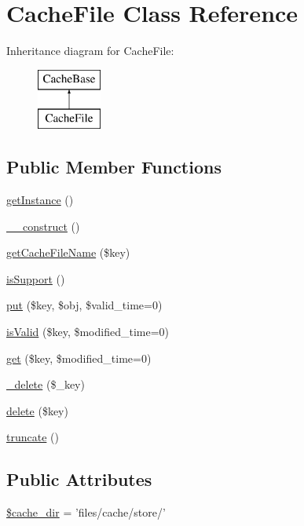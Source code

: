 \hypertarget{classCacheFile}{\section{Cache\-File Class Reference}
\label{classCacheFile}
}
Inheritance diagram for Cache\-File\-:\begin{figure}[H]
\begin{center}
\leavevmode
\includegraphics[height=2.000000cm]{classCacheFile}
\end{center}
\end{figure}
\subsection*{Public Member Functions}
\begin{DoxyCompactItemize}
\item 
\hyperlink{classCacheFile_a5389ea809c31aed387c12eb37b2677b8}{get\-Instance} ()
\item 
\hyperlink{classCacheFile_ac907fef293d1d4a31163651440167bff}{\-\_\-\-\_\-construct} ()
\item 
\hyperlink{classCacheFile_a15ca23dea98604dc2e6d067f9ce48242}{get\-Cache\-File\-Name} (\$key)
\item 
\hyperlink{classCacheFile_ab3982221be8af4a74302b648831d1376}{is\-Support} ()
\item 
\hyperlink{classCacheFile_a1883472236dececa9215546dae2733cc}{put} (\$key, \$obj, \$valid\-\_\-time=0)
\item 
\hyperlink{classCacheFile_ab154224d403ed4199885414cfa34d713}{is\-Valid} (\$key, \$modified\-\_\-time=0)
\item 
\hyperlink{classCacheFile_aa5834aeb4fce61fe5e99d06fe3795d84}{get} (\$key, \$modified\-\_\-time=0)
\item 
\hyperlink{classCacheFile_a59058fb815de83e25ec107fec5dff2d2}{\-\_\-delete} (\$\-\_\-key)
\item 
\hyperlink{classCacheFile_aae765f3dbe6d888b5e272c247f696518}{delete} (\$key)
\item 
\hyperlink{classCacheFile_a990fc76da2501ced9077aff881350f7f}{truncate} ()
\end{DoxyCompactItemize}
\subsection*{Public Attributes}
\begin{DoxyCompactItemize}
\item 
\hyperlink{classCacheFile_a39d0574a28dd55f6b312811f411f2f51}{\$cache\-\_\-dir} = 'files/cache/store/'
\end{DoxyCompactItemize}



